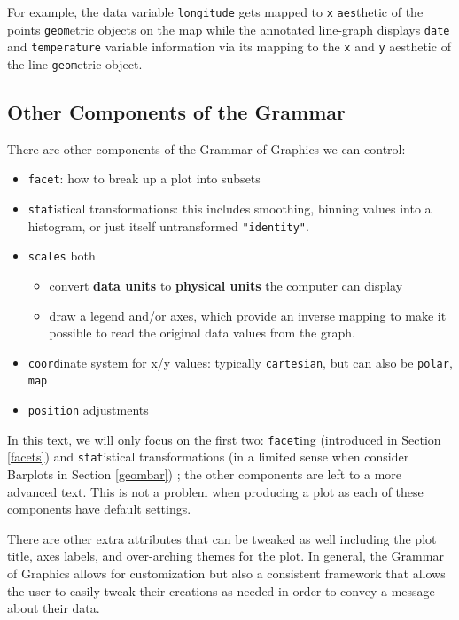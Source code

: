 \documentclass[]{tufte-book}
\providecommand{\tightlist}{%
  \setlength{\itemsep}{0pt}\setlength{\parskip}{0pt}}
\begin{document}
For example, the data variable \texttt{longitude} gets mapped to
\texttt{x} \texttt{aes}thetic of the points \texttt{geom}etric objects
on the map while the annotated line-graph displays \texttt{date} and
\texttt{temperature} variable information via its mapping to the
\texttt{x} and \texttt{y} aesthetic of the line \texttt{geom}etric
object.

\subsection{Other Components of the
Grammar}\label{other-components-of-the-grammar}

There are other components of the Grammar of Graphics we can control:

\begin{itemize}
\tightlist
\item
  \texttt{facet}: how to break up a plot into subsets
\item
  \texttt{stat}istical transformations: this includes smoothing, binning
  values into a histogram, or just itself untransformed
  \texttt{"identity"}.
\item
  \texttt{scales} both

  \begin{itemize}
  \tightlist
  \item
    convert \textbf{data units} to \textbf{physical units} the computer
    can display
  \item
    draw a legend and/or axes, which provide an inverse mapping to make
    it possible to read the original data values from the graph.
  \end{itemize}
\item
  \texttt{coord}inate system for x/y values: typically
  \texttt{cartesian}, but can also be \texttt{polar}, \texttt{map}
\item
  \texttt{position} adjustments
\end{itemize}

In this text, we will only focus on the first two: \texttt{facet}ing
(introduced in Section \ref{facets}) and \texttt{stat}istical
transformations (in a limited sense when consider Barplots in Section
\ref{geombar}) ; the other components are left to a more advanced text.
This is not a problem when producing a plot as each of these components
have default settings.

There are other extra attributes that can be tweaked as well including
the plot title, axes labels, and over-arching themes for the plot. In
general, the Grammar of Graphics allows for customization but also a
consistent framework that allows the user to easily tweak their
creations as needed in order to convey a message about their data.
\end{document}
